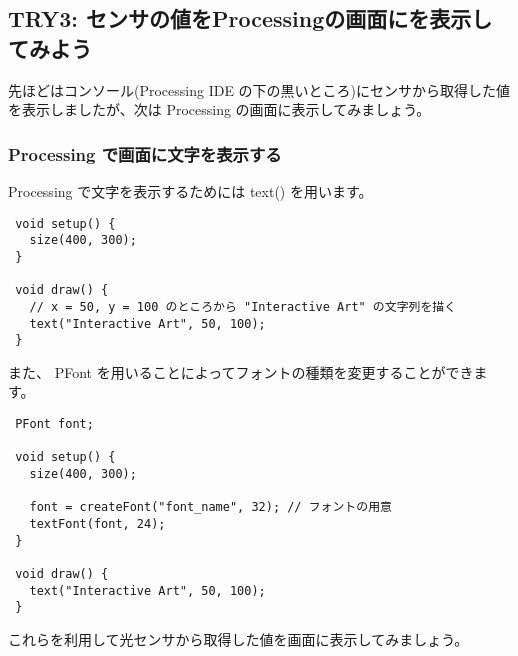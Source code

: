 \documentclass[11pt,a4paper]{jarticle}
\begin{document}
\subsection*{TRY3: センサの値をProcessingの画面にを表示してみよう}
先ほどはコンソール(Processing IDE の下の黒いところ)にセンサから取得した値を表示しましたが、次は Processing の画面に表示してみましょう。

\subsubsection*{Processing で画面に文字を表示する}
Processing で文字を表示するためには text() を用います。
\begin{lstlisting}
 void setup() {
   size(400, 300);
 }

 void draw() {
   // x = 50, y = 100 のところから "Interactive Art" の文字列を描く
   text("Interactive Art", 50, 100);
 }
\end{lstlisting}

また、 PFont を用いることによってフォントの種類を変更することができます。
\begin{lstlisting}
 PFont font;

 void setup() {
   size(400, 300);
 
   font = createFont("font_name", 32); // フォントの用意
   textFont(font, 24);
 }

 void draw() {
   text("Interactive Art", 50, 100);
 }
\end{lstlisting}

これらを利用して光センサから取得した値を画面に表示してみましょう。


  
 
\end{document}
